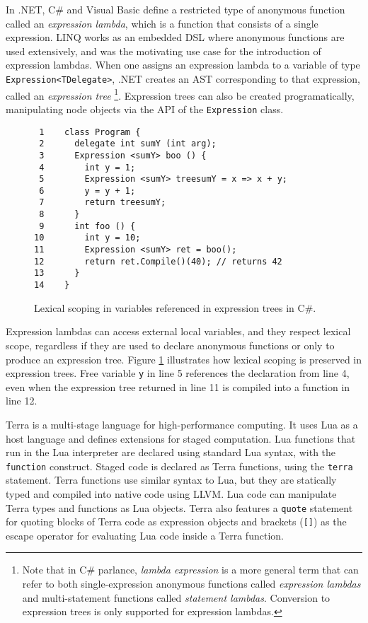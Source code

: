 \documentclass[english]{llncs}
\begin{document}
In .NET, C\# and Visual Basic define a restricted type of anonymous
function called an \emph{expression lambda}, which is a function that
consists of a single expression. LINQ works as an embedded DSL
\cite{Fowler:2010:DSL:1809745} where anonymous functions are used
extensively, and was the motivating use case for the introduction
of expression lambdas. When one assigns an expression lambda to a variable
of type \texttt{Expression<TDelegate>}, .NET creates an AST
corresponding to that expression, called an \emph{expression tree}
\footnote{Note that in C\# parlance, \emph{lambda expression} is a
more general term that can refer to both single-expression anonymous functions
called \emph{expression lambdas} and multi-statement functions called
\emph{statement lambdas}. Conversion to expression trees is only supported for
expression lambdas.}. Expression trees can also be created 
programatically, manipulating node objects via the API of the
\texttt{Expression} class.

\begin{figure}[t]
\begin{verbatim}
 1    class Program {
 2      delegate int sumY (int arg);
 3      Expression <sumY> boo () {
 4        int y = 1;
 5        Expression <sumY> treesumY = x => x + y;
 6        y = y + 1;
 7        return treesumY;
 8      }
 9      int foo () {
10        int y = 10;
11        Expression <sumY> ret = boo();
12        return ret.Compile()(40); // returns 42
13      }
14    }
\end{verbatim}
\protect\caption{\label{fig:ExpressionTrees}Lexical scoping in variables
referenced in expression trees in C\#.}
\end{figure}

Expression lambdas can access external local variables, and they respect
lexical scope, regardless if they are used to declare anonymous functions or
only to produce an expression tree. Figure
\ref{fig:ExpressionTrees} illustrates how lexical scoping is preserved in
expression trees. Free variable \texttt{y} in line 5 references the declaration
from line 4, even when the expression tree returned in line 11 is compiled
into a function in line 12.

Terra \cite{DeVito2013Terra} is a multi-stage language for high-performance
computing. It uses Lua as a host language and defines extensions
for staged computation. Lua functions that run in the Lua interpreter are
declared using standard Lua syntax, with the \texttt{function} construct.
Staged code is declared as Terra functions, using the \texttt{terra}
statement. Terra functions use similar syntax to Lua, but they are statically
typed and compiled into native code using LLVM. Lua code can manipulate Terra
types and functions as Lua objects. Terra also features a \texttt{quote} statement
for quoting blocks of Terra code as expression objects and brackets
(\texttt{[]}) as the escape operator for evaluating Lua code inside a Terra
function.
\end{document}
